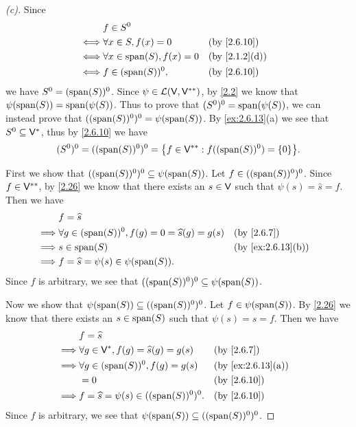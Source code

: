 \begin{proof}[(c)]
  Since
  \begin{align*}
         & f \in S^0                                          \\
    \iff & \forall x \in S, f(x) = 0       &  & \by{2.6.10}   \\
    \iff & \forall x \in \spn{S}, f(x) = 0 &  & \by{2.1.2}[d] \\
    \iff & f \in (\spn{S})^0,              &  & \by{2.6.10}
  \end{align*}
  we have \(S^0 = (\spn{S})^0\).
  Since \(\psi \in \mathcal{L}(\mathsf{V}, \mathsf{V}^{**})\), by \cref{2.2} we know that \(\psi(\spn{S}) = \spn{\psi(S)}\).
  Thus to prove that \((S^0)^0 = \spn{\psi(S)}\), we can instead prove that \(((\spn{S})^0)^0 = \psi(\spn{S})\).
  By \cref{ex:2.6.13}(a) we see that \(S^0 \subseteq \mathsf{V}^*\), thus by \cref{2.6.10} we have
  \[
    (S^0)^0 = ((\spn{S})^0)^0 = \set{f \in \V^{**} : f((\spn{S})^0) = \set{0}}.
  \]

  First we show that \(((\spn{S})^0)^0 \subseteq \psi(\spn{S})\).
  Let \(f \in ((\spn{S})^0)^0\).
  Since \(f \in \mathsf{V}^{**}\), by \cref{2.26} we know that there exists an \(s \in \mathsf{V}\) such that \(\psi(s) = \widehat{s} = f\).
  Then we have
  \begin{align*}
             & f = \widehat{s}                                                                    \\
    \implies & \forall g \in (\spn{S})^0, f(g) = 0 = \widehat{s}(g) = g(s) &  & \by{2.6.7}        \\
    \implies & s \in \spn{S}                                               &  & \by{ex:2.6.13}[b] \\
    \implies & f = \widehat{s} = \psi(s) \in \psi(\spn{S}).
  \end{align*}
  Since \(f\) is arbitrary, we see that \(((\spn{S})^0)^0 \subseteq \psi(\spn{S})\).

  Now we show that \(\psi(\spn{S}) \subseteq ((\spn{S})^0)^0\).
  Let \(f \in \psi(\spn{S})\).
  By \cref{2.26} we know that there exists an \(s \in \spn{S}\) such that \(\psi(s) = \widehat{s} = f\).
  Then we have
  \begin{align*}
             & f = \widehat{s}                                                         \\
    \implies & \forall g \in \V^*, f(g) = \widehat{s}(g) = g(s) &  & \by{2.6.7}        \\
    \implies & \forall g \in (\spn{S})^0, f(g) = g(s)           &  & \by{ex:2.6.13}[a] \\
             & = 0                                              &  & \by{2.6.10}       \\
    \implies & f = \widehat{s} = \psi(s) \in ((\spn{S})^0)^0.   &  & \by{2.6.10}
  \end{align*}
  Since \(f\) is arbitrary, we see that \(\psi(\spn{S}) \subseteq ((\spn{S})^0)^0\).
\end{proof}

